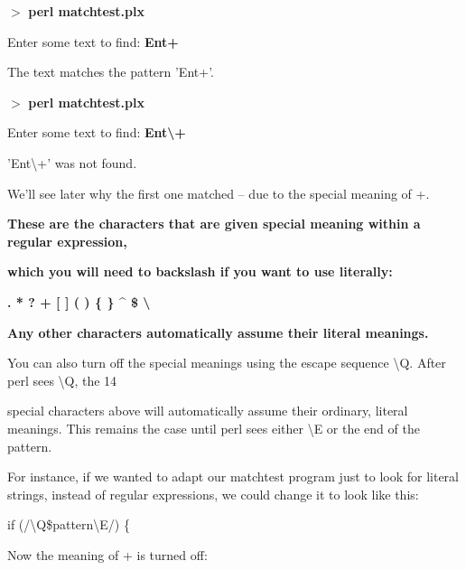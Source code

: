 \documentclass[a4paper,11pt]{book}
\begin{document}
\noindent 

\noindent $>$ \textbf{perl matchtest.plx}

\noindent Enter some text to find: \textbf{Ent+}

\noindent The text matches the pattern 'Ent+'.

\noindent 

\noindent $>$ \textbf{perl matchtest.plx}

\noindent Enter some text to find: \textbf{Ent\textbackslash +}

\noindent 'Ent\textbackslash +' was not found.

\noindent 

\noindent We'll see later why the first one matched -- due to the special meaning of +.

\noindent 

\noindent 

\noindent \textbf{These are the characters that are given special meaning within a regular expression,}

\noindent \textbf{which you will need to backslash if you want to use literally:}

\noindent 

\noindent \textbf{. * ? + [ ] ( ) \{ \} \^{} \$ \textbar  \textbackslash }

\noindent 

\noindent \textbf{Any other characters automatically assume their literal meanings.}

\noindent 

\noindent 

\noindent You can also turn off the special meanings using the escape sequence \textbackslash Q. After perl sees \textbackslash Q, the 14

\noindent special characters above will automatically assume their ordinary, literal meanings. This remains the case until perl sees either \textbackslash E or the end of the pattern.

\noindent 

\noindent For instance, if we wanted to adapt our matchtest program just to look for literal strings, instead of regular expressions, we could change it to look like this:

\noindent 

\noindent if (/\textbackslash Q\$pattern\textbackslash E/) \{

\noindent 

\noindent Now the meaning of + is turned off:
\end{document}

